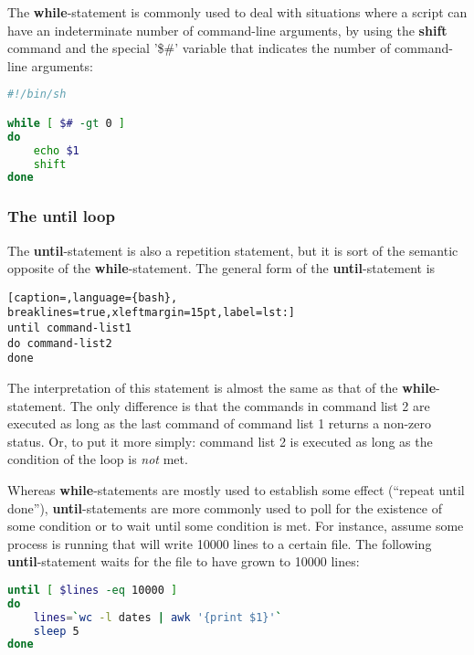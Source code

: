 The \textbf{while}-statement is commonly used to deal with situations where a
script can have an indeterminate number of command-line arguments, by using the
\textbf{shift} command and the special '\$\#' variable that indicates the
number of command-line arguments:
\lstset{basicstyle=\scriptsize, numbers=left, captionpos=b, tabsize=4}
\begin{lstlisting}[caption=Printing all the command-line arguments,language={bash},
breaklines=true,xleftmargin=15pt,label=lst:Printing all the command-line arguments]
#!/bin/sh

while [ $# -gt 0 ]
do
    echo $1
    shift
done
\end{lstlisting}

\subsubsection{The until loop}
The \textbf{until}-statement is also a repetition statement, but it is sort of
the semantic opposite of the \textbf{while}-statement. The general form of the
\textbf{until}-statement is
\lstset{basicstyle=\scriptsize, numbers=left, captionpos=b, tabsize=4}
\begin{lstlisting}[caption=,language={bash},
breaklines=true,xleftmargin=15pt,label=lst:]
until command-list1
do command-list2
done
\end{lstlisting}

The interpretation of this statement is almost the same as that of the
\textbf{while}-statement. The only difference is that the commands in command
list 2 are executed as long as the last command of command list 1 returns a
non-zero status. Or, to put it more simply: command list 2 is executed as long
as the condition of the loop is \emph{not} met.

Whereas \textbf{while}-statements are mostly used to establish some effect
(``repeat until done''), \textbf{until}-statements are more commonly used to
poll for the existence of some condition or to wait until some condition is
met. For instance, assume some process is running that will write 10000 lines
to a certain file. The following \textbf{until}-statement waits for the file to
have grown to 10000 lines:
\lstset{basicstyle=\scriptsize, numbers=left, captionpos=b, tabsize=4}
\begin{lstlisting}[caption=Waiting for myfile.txt to grow to 10000 lines,language={bash},
breaklines=true,xleftmargin=15pt,label=lst:Waiting for myfile.txt to grow to 10000 lines]
until [ $lines -eq 10000 ]
do
    lines=`wc -l dates | awk '{print $1}'`
    sleep 5
done
\end{lstlisting}

